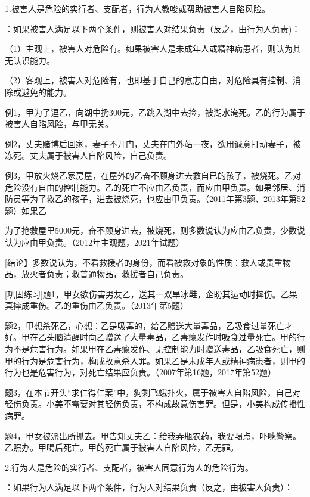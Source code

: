 1.被害人是危险的实行者、支配者，行为人教唆或帮助被害人自陷风险。

：如果被害人满足以下两个条件，则被害人对结果负责（反之，由行为人负责)：

（1）主观上，被害人对危险有。如果被害人是未成年人或精神病患者，则认为其无认识能力。

（2）客观上，被害人对危险有，也即基于自己的意志自由，对危险具有控制、消除或避免的能力。

例1，甲为了逗乙，向湖中扔300元，乙跳入湖中去捡，被湖水淹死。乙的行为属于被害人自陷风险，与甲无关。

例2，丈夫赌博后回家，妻子不开门，丈夫在门外站一夜，欲用诚意打动妻子，被冻死。丈夫属于被害人自陷风险，自己负责。

例3，甲放火烧乙家房屋，在屋外的乙奋不顾身进去救自已的孩子，被烧死。乙对危险没有自由的控制能力。乙的死亡不应由乙负责，而应由甲负责。如果邻居、消防员等为了救乙的孩子，进去被烧死，也应由甲负责。（2011年第3题、2013年第52题）如果乙

为了抢救屋里5000元，奋不顾身进去，被烧死，则多数说认为应由乙负责，少数说认为应由甲负责。（2012年主观题，2021年试题）

[结论】多数说认为，不看救援者的身份，而看被救对象的性质：救人或贵重物品，放火者负责；救普通物品，救援者自己负责。

[巩固练习]题1，甲女欲伤害男友乙，送其一双旱冰鞋，企盼其运动时摔伤。乙果真摔成重伤。乙的重伤由乙负责。（2013年第5题）

题2，甲想杀死乙，心想：乙是吸毒的，给乙赠送大量毒品，乙吸食过量死亡才好。甲在乙头脑清醒时向乙赠送了大量毒品，乙毒瘾发作时吸食过量死亡。甲的行为不是危害行为。如果甲在乙毒瘾发作、无控制能力时赠送毒品，乙吸食死亡，则甲的行为是危害行为，构成故意杀人罪。如果乙是未成年人或精神病患者，则甲的行为也是危害行为，对死亡结果应负责。（2007年第16题，2017年第52题）

题3，在本节开头“求仁得仁案”中，狗剩飞蛾扑火，属于被害人自陷风险，自己对轻伤负责。小美不需要对其轻伤负责，不构成故意伤害罪。但是，小美构成传播性病罪。

题4，甲女被派出所抓去。甲告知丈夫乙：给我弄瓶农药，我要喝点，吓唬警察。乙照办。甲喝后死亡。甲的死亡属于被害人自陷风险，乙无罪。

2.行为人是危险的实行者、支配者，被害人同意行为人的危险行为。

：如果行为人满足以下两个条件，行为人对结果负责（反之，由被害人负责）：

